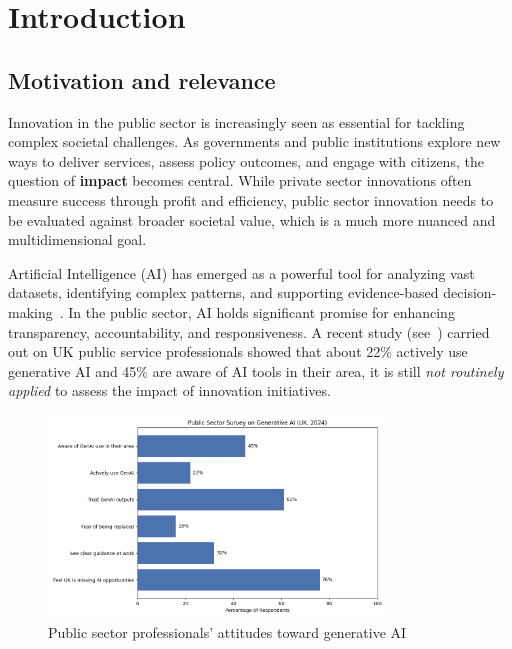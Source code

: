 
\chapter{Introduction}\label{ch:introduction}


\section{Motivation and relevance}\label{sec:motivation}

Innovation in the public sector is increasingly seen as essential for tackling complex societal challenges.
As governments and public institutions explore new ways to deliver services, assess policy outcomes, and engage with citizens, the question of \textbf{impact} becomes central.
While private sector innovations often measure success through profit and efficiency, public sector innovation needs to be evaluated against broader societal value, which is a much more nuanced and multidimensional goal.

Artificial Intelligence (AI) has emerged as a powerful tool for analyzing vast datasets, identifying complex patterns, and supporting evidence-based decision-making~\parencite{russell2016artificial, marr2018data}.
In the public sector, AI holds significant promise for enhancing transparency, accountability, and responsiveness.
A recent study (see~\cite{cornell2024}) carried out on UK public service professionals showed that about 22\% actively use generative AI and 45\% are aware of AI tools in their area, it is still \textit{not routinely applied} to assess the impact of innovation initiatives.


\begin{figure}[H]
  \centering
  \includegraphics[width=0.8\textwidth]{../fig/ai_awareness_uk}
  \caption{Public sector professionals' attitudes toward generative AI ~\parencite{cornell2024}}
  \label{fig:genai_survey}
\end{figure}


